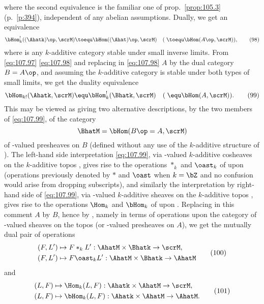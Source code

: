 where the second equivalence is the familiar one of prop.\
\ref{prop:105.3} (p.\ \ref{p:394}), independent of any abelian
assumptions. Dually, we get an equivalence
\begin{equation}
  \label{eq:107.98}
  \bHom_k^!((\Ahatk)\op,\scrM)\toequ \bHom((\Ahat)\op,\scrM)
  \quad(\;\toequ \bHom(A\op,\scrM)),\tag{98}
\end{equation}
where \scrM{} is any $k$-additive category stable under small inverse
limits. From \eqref{eq:107.97} \eqref{eq:107.98} and replacing in
\eqref{eq:107.98} $A$ by the dual category $B=A\op$, and assuming the
$k$-additive category \scrM{} is stable under both types of small
limits, we get the duality equivalence
\begin{equation}
  \label{eq:107.99}
  \bHom_{k!}(\Ahatk,\scrM)\equ \bHom_k^!(\Bhatk,\scrM) \quad (\;\equ
  \bHom(A,\scrM)).\tag{99} 
\end{equation}
This may be viewed as giving two alternative descriptions, by the two
members of \eqref{eq:107.99}, of the category
\[\BhatM = \bHom(B\op=A,\scrM)\]
of \scrM-valued presheaves on $B$ (defined without any use of the
$k$-additive structure of \scrM). The left-hand side interpretation
\eqref{eq:107.99}, via \scrM-valued\pspage{422} $k$-additive cosheaves
on the $k$-additive topos \Ahatk, gives rise to the operations $*_k$
and $\oast_k$ of \Ahatk{} upon \BhatM{} (operations previously denoted
by $*$ and $\oast$ when $k=\bZ$ and no confusion would arise from
dropping subscripts), and similarly the interpretation by right-hand
side of \eqref{eq:107.99}, via \scrM-valued $k$-additive sheaves on
the $k$-additive topos \Bhatk, gives rise to the operations $\Hom_k$
and $\bHom_k$ of \Bhatk{} upon \BhatM. Replacing in this comment $A$
by $B$, hence \Bhat{} by \Ahat, namely in terms of operations upon the
category of \scrM-valued sheaves on the topos \Ahat{} (or \scrM-valued
presheaves on $A$), we get the mutually dual pair of operations
\begin{equation}
  \label{eq:107.100}
  \begin{aligned}
    (F,L')&\mapsto F*_kL' : \AhatM\times\Bhatk\to\scrM, \\
    (F,L')&\mapsto F\oast_kL' : \AhatM\times\Bhatk\to\AhatM
  \end{aligned}
  \tag{100}
\end{equation}
and
\begin{equation}
  \label{eq:107.101}
  \begin{aligned}
    (L,F)&\mapsto \Hom_k(L,F) : \Ahatk\times\AhatM\to\scrM, \\
    (L,F)&\mapsto \bHom_k(L,F) : \Ahatk\times\AhatM\to\AhatM.
  \end{aligned}
  \tag{101}
\end{equation}
